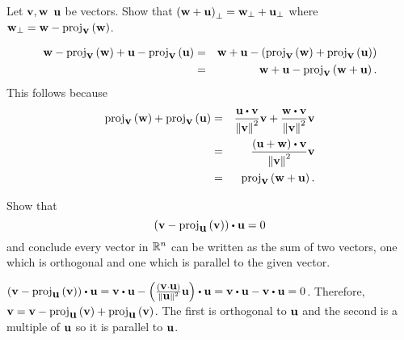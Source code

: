 \begin{enumialphparenastyle}
\begin{ex}\label{perp-linear}
  Let $\mbox{\bf v},\mbox{\bf w}$ $\mbox{\bf u}$ be vectors. Show that
  $\left(\mbox{\bf w}+\mbox{\bf u}\right) _{\perp }=\mbox{\bf w}_{\perp }+\mbox{\bf u}_{\perp
  }$ where
  $\mbox{\bf w}_{\perp }=\mbox{\bf w}-\mbox{\rm proj}_{\mbox{\bf v}}\left(\mbox{\bf w}\right)$.
  \begin{sol}
    \begin{eqnarray*}
      \mbox{\bf w}-\mbox{\rm proj}_{\mbox{\bf v}}\left(\mbox{\bf w}\right) +\mbox{\bf u}- \mbox{\rm proj}_{\mbox{\bf v}}\left(\mbox{\bf u}\right) 
      &=& \mbox{\bf w}+\mbox{\bf u}-\left(\mbox{\rm proj}_{\mbox{\bf v}}\left(\mbox{\bf w}\right) +\mbox{\rm proj}_{\mbox{\bf v}}\left(\mbox{\bf u}\right) \right) \\
      &=&\mbox{\bf w}+\mbox{\bf u}-\mbox{\rm proj}_{\mbox{\bf v}}\left(\mbox{\bf w}+\mbox{\bf u}\right).
    \end{eqnarray*}
    This follows because 
    \begin{eqnarray*}
      \func{proj}_{\vect{v}}\tup{\vect{w}} +\func{proj}_{\vect{v}}\tup{
      \vect{u}}
      &=& \frac{\vect{u}\dotprod \vect{v}}{\norm{\vect{v}} ^{2}}\vect{v}+
          \frac{\vect{w}\dotprod \vect{v}}{\norm{\vect{v}} ^{2}}\vect{v} \\
      &=& \frac{\tup{\vect{u}+\vect{w}} \dotprod \vect{v}}{\norm{\vect{v}
          } ^{2}}\vect{v} \\
      &=& \func{proj}_{\vect{v}}\tup{\vect{w}+\vect{u}}.
    \end{eqnarray*}
  \end{sol}
\end{ex}

\begin{ex} Show that
  \begin{equation*}
    \tup{\vect{v}-\func{proj}_{\vect{u}
      }\tup{\vect{v}} } \dotprod \vect{u}=0
  \end{equation*}
  and conclude every vector in $\mathbb{R}^{n}$ can be written as the sum of
  two vectors, one which is orthogonal and one which is parallel to
  the given vector.
  \begin{sol}
    $\tup{\vect{v}-\func{proj}_{\vect{u}}\tup{\vect{v}} } \dotprod
    \vect{u} = \vect{v} \dotprod \vect{u}
    -\tup{\frac{\tup{\vect{v}\cdot\vect{u}} }{\norm{\vect{u}}
        ^{2}}\vect{u} } \dotprod \vect{u} = \vect{v} \dotprod \vect{u}
    - \vect{v} \dotprod \vect{u} =0$. Therefore,
    $\mbox{\bf v} = \mbox{\bf v} - \mbox{\rm proj}_{\mbox{\bf u}}\left(\mbox{\bf v}\right) +
    \mbox{\rm proj}_{\mbox{\bf u}}\left(\mbox{\bf v}\right)$. The first is orthogonal to
    $\mbox{\bf u}$ and the second is a multiple of $\mbox{\bf u}$ so it is
    parallel to $\mbox{\bf u}$.
  \end{sol}
\end{ex}

\end{enumialphparenastyle}
